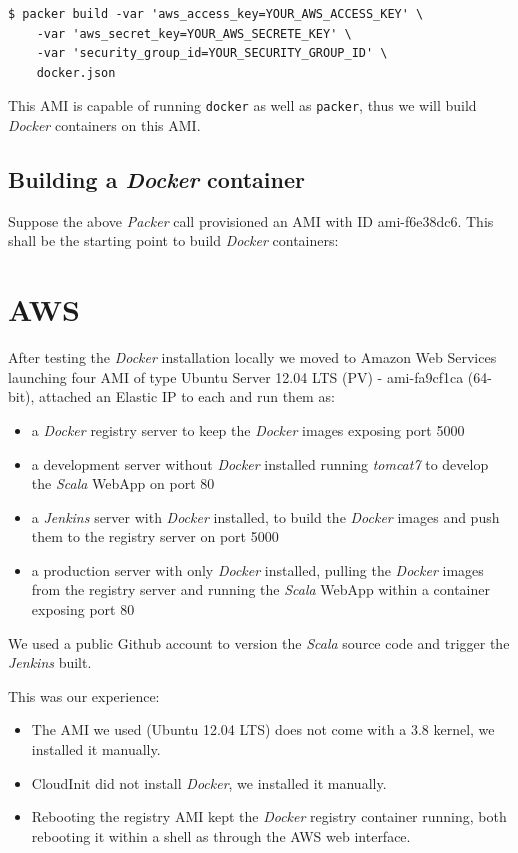 \documentclass[captions=tableheading]{article}
\begin{document}
\begin{verbatim}
$ packer build -var 'aws_access_key=YOUR_AWS_ACCESS_KEY' \ 
    -var 'aws_secret_key=YOUR_AWS_SECRETE_KEY' \
    -var 'security_group_id=YOUR_SECURITY_GROUP_ID' \ 
    docker.json
\end{verbatim}
This AMI is capable of running \texttt{docker} as well as \texttt{packer}, thus we will build \emph{Docker} containers on this AMI.
\subsection{Building a \emph{Docker} container}
\label{sec-7-4}

Suppose the above \emph{Packer} call provisioned an AMI with ID ami-f6e38dc6. This shall be the starting point to build \emph{Docker} containers:
\section{AWS}
\label{sec-8}

After testing the \emph{Docker} installation locally we moved to Amazon Web Services launching four AMI  of type Ubuntu Server 12.04 LTS (PV) - ami-fa9cf1ca (64-bit), attached an Elastic IP to each and run them as:
\begin{itemize}
\item a \emph{Docker} registry server to keep the \emph{Docker} images exposing port 5000
\item a development server  without \emph{Docker} installed running \emph{tomcat7} to develop the  \emph{Scala} WebApp on port 80
\item a \emph{Jenkins} server with \emph{Docker} installed, to build the \emph{Docker} images and push them to the registry server on port 5000
\item a production server with only \emph{Docker} installed, pulling the \emph{Docker} images from the registry server and running the  \emph{Scala} WebApp within a container exposing port 80
\end{itemize}
We used a public Github account to version the \emph{Scala} source code and trigger the \emph{Jenkins} built.

This was our experience:
\begin{itemize}
\item The AMI we used (Ubuntu 12.04 LTS) does not come with a 3.8 kernel, we installed it  manually.
\item CloudInit did not install \emph{Docker}, we installed it  manually.
\item Rebooting the registry AMI kept the \emph{Docker} registry container running, both rebooting it within a shell as through the AWS web interface.
\end{itemize}
\end{document}
